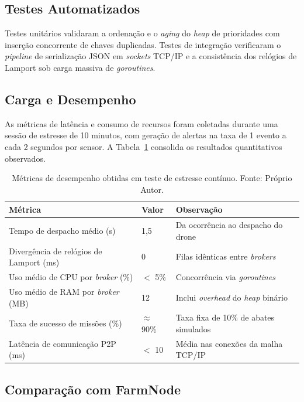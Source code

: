 \subsection{Testes Automatizados}
\label{sub:testes_automatizados}

Testes unitários validaram a ordenação e o \textit{aging} do \textit{heap} de prioridades com inserção concorrente de chaves duplicadas. Testes de integração verificaram o \textit{pipeline} de serialização JSON em \textit{sockets} TCP/IP e a consistência dos relógios de Lamport sob carga massiva de \textit{goroutines}.

\subsection{Carga e Desempenho}
\label{sub:carga_desempenho}

As métricas de latência e consumo de recursos foram coletadas durante uma sessão de estresse de 10 minutos, com geração de alertas na taxa de 1 evento a cada 2 segundos por sensor. A Tabela~\ref{tab:performance} consolida os resultados quantitativos observados.

\begin{table}[ht]
  \centering
  \sloppy
  \caption{Métricas de desempenho obtidas em teste de estresse contínuo. Fonte: Próprio Autor.}
  \label{tab:performance}
  \begin{tabular}{p{5.5cm}p{2.5cm}p{5.0cm}}
    \toprule
    \textbf{Métrica} & \textbf{Valor} & \textbf{Observação} \\
    \midrule
    Tempo de despacho médio (s) & 1,5 & Da ocorrência ao despacho do drone \\
    Divergência de relógios de Lamport (ms) & 0 & Filas idênticas entre \textit{brokers} \\
    Uso médio de CPU por \textit{broker} (\%) & $<$ 5\% & Concorrência via \textit{goroutines} \\
    Uso médio de RAM por \textit{broker} (MB) & 12 & Inclui \textit{overhead} do \textit{heap} binário \\
    Taxa de sucesso de missões (\%) & $\approx$\,90\% & Taxa fixa de 10\% de abates simulados \\
    Latência de comunicação P2P (ms) & $<$ 10 & Média nas conexões da malha TCP/IP \\
    \bottomrule
  \end{tabular}
\end{table}

\subsection{Comparação com FarmNode}
\label{sub:comparacao_farmnode}

